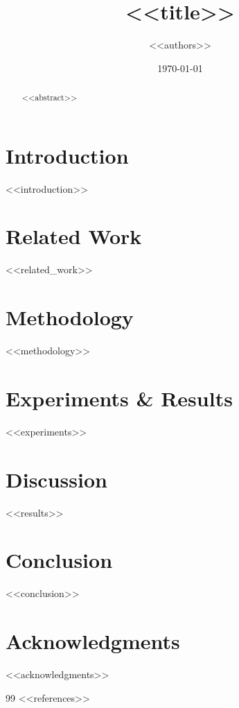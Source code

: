 \documentclass[12pt,a4paper]{article}
\title{<<title>>}
\author{<<authors>>}
\date{\today}
\begin{document}
\maketitle

\begin{abstract}
<<abstract>>
\end{abstract}

\tableofcontents
\newpage

\section{Introduction}
\label{sec:intro}

<<introduction>>

\section{Related Work}
\label{sec:related}

<<related_work>>

\section{Methodology}
\label{sec:methodology}

<<methodology>>

\section{Experiments \& Results}
\label{sec:experiments}

<<experiments>>

\section{Discussion}
\label{sec:discussion}

<<results>>

\section{Conclusion}
\label{sec:conclusion}

<<conclusion>>

\section*{Acknowledgments}

<<acknowledgments>>

\begin{thebibliography}{99}
<<references>>
\end{thebibliography}
\end{document}
